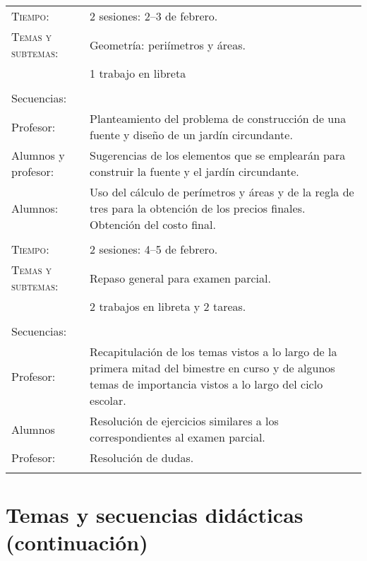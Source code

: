 \documentclass[letterpaper,10pt]{article}
\begin{document}
\begin{tabular}[t]{R{0.25\textwidth}p{0.71\textwidth}}
\textsc{Tiempo:}          & 2 sesiones: 2--3  de febrero. \\
    \textsc{Temas y subtemas:}& Geometr\'ia: peri\'imetros y \'areas.\\    
    & 1 trabajo en libreta\\ \\
    \large{\sc Secuencias:} \\
    Profesor:   & Planteamiento del problema de construcci\'on de una fuente y
    dise\~no de un jard\'in circundante. \\
    Alumnos y profesor:& Sugerencias de los elementos que se emplear\'an para 
    construir la fuente y el jard\'in circundante. \\
    Alumnos:    & Uso del c\'alculo de per\'imetros y \'areas y de la regla de
    tres para la obtenci\'on de los precios finales. Obtenci\'on del costo 
    final.
\\ \hline \\
\textsc{Tiempo:}          & 2 sesiones: 4--5  de febrero. \\
    \textsc{Temas y subtemas:}& Repaso general para examen parcial.\\    
    & 2 trabajos en libreta y 2 tareas. \\ \\
    \large{\sc Secuencias:} \\
    Profesor:   & Recapitulaci\'on de los temas vistos a lo largo de la primera 
    mitad del bimestre en curso y de algunos temas de importancia vistos a lo 
    largo del ciclo escolar. \\
    Alumnos     & Resoluci\'on de ejercicios similares a los correspondientes al
    examen parcial. \\
    Profesor:   & Resoluci\'on de dudas.
\\ \hline \\ 
\end{tabular}

\section{Temas  y secuencias did\'acticas (continuaci\'on)}
\end{document}
